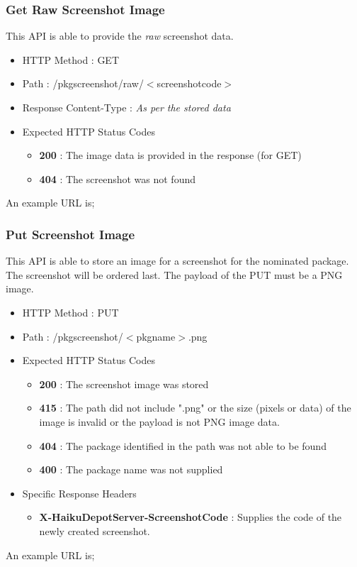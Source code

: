 
\subsubsection{Get Raw Screenshot Image}

This API is able to provide the {\it raw} screenshot data.

\begin{itemize}
\item HTTP Method : GET
\item Path : /pkgscreenshot/raw/$<$screenshotcode$>$
\item Response Content-Type : {\it As per the stored data}
\item Expected HTTP Status Codes
  \begin{itemize}
  \item {\bf 200} : The image data is provided in the response (for GET)
  \item {\bf 404} : The screenshot was not found
  \end{itemize}
\end{itemize}

An example URL is;


\subsubsection{Put Screenshot Image}

This API is able to store an image for a screenshot for the nominated package.  The screenshot will be ordered last.  The payload of the PUT must be a PNG image.

\begin{itemize}
\item HTTP Method : PUT
\item Path : /pkgscreenshot/$<$pkgname$>$.png
\item Expected HTTP Status Codes
  \begin{itemize}
  \item {\bf 200} : The screenshot image was stored
  \item {\bf 415} : The path did not include ".png" or the size (pixels or data) of the image is invalid or the payload is not PNG image data.
  \item {\bf 404} : The package identified in the path was not able to be found
  \item {\bf 400} : The package name was not supplied
  \end{itemize}
\item Specific Response Headers
  \begin{itemize}
  \item {\bf X-HaikuDepotServer-ScreenshotCode} : Supplies the code of the newly created screenshot.
  \end{itemize}
\end{itemize}

An example URL is;






